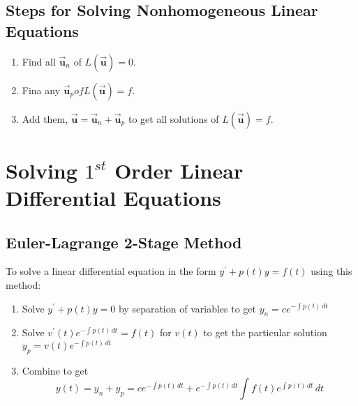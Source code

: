 \documentclass[12pt,landscape,twocolumn]{article}
\let\oldvec\vec
\renewcommand{\vec}[1]{\oldvec{\mathbf{ #1 } } }                    %
\begin{document}
    \subsection{Steps for Solving Nonhomogeneous Linear Equations}
    \begin{enumerate}
    \item Find all $\vec{u}_n$ of $L(\vec{u}) = 0$.
    \item Fina any $\vec{u}_p of L(\vec{u}) = f$.
    \item Add them, $\vec{u} = \vec{u}_n + \vec{u}_p$ to get all solutions of $L(\vec{u}) = f$.
    \end{enumerate}

\section{Solving $1^{st}$ Order Linear Differential Equations}
    \subsection{Euler-Lagrange 2-Stage Method}

    To solve a linear differential equation in the form $y^\prime + p(t) y = f(t)$ using this method:

    \begin{enumerate}
    \item Solve
        $
        y^\prime + p(t)y = 0
        $
        by separation of variables to get 
        $
        y_n = c e^{-\int p(t)\, dt}
        $
    \item Solve
        $
        v^\prime(t) e^{-\int p(t)\, dt} = f(t)
        $
        for $v(t)$ to get the particular solution
        $
        y_p = v(t) e^{-\int p(t)\, dt}
        $
    \item Combine to get
        \begin{equation}\label{eq:el2sm}
        y(t) = y_n + y_p = c e^{-\int p(t)\, dt} + e^{-\int p(t)\, dt} \int f(t) e^{\int p(t)\, dt} \, dt
        \end{equation}
    \end{enumerate}
\end{document}
